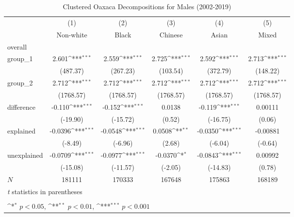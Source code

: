 \begin{table}[htbp]\centering
\def\sym#1{\ifmmode^{#1}\else\(^{#1}\)\fi}
\caption{Clustered Oaxaca Decompositions for Males (2002-2019)\label{tab1}}
\begin{tabular}{l*{5}{c}}
\hline\hline
            &\multicolumn{1}{c}{(1)}&\multicolumn{1}{c}{(2)}&\multicolumn{1}{c}{(3)}&\multicolumn{1}{c}{(4)}&\multicolumn{1}{c}{(5)}\\
            &\multicolumn{1}{c}{Non-white}&\multicolumn{1}{c}{Black}&\multicolumn{1}{c}{Chinese}&\multicolumn{1}{c}{Asian}&\multicolumn{1}{c}{Mixed}\\
\hline
overall     &                     &                     &                     &                     &                     \\
group\_1     &       2.601\sym{***}&       2.559\sym{***}&       2.725\sym{***}&       2.592\sym{***}&       2.713\sym{***}\\
            &    (487.37)         &    (267.23)         &    (103.54)         &    (372.79)         &    (148.22)         \\
group\_2     &       2.712\sym{***}&       2.712\sym{***}&       2.712\sym{***}&       2.712\sym{***}&       2.712\sym{***}\\
            &   (1768.57)         &   (1768.57)         &   (1768.57)         &   (1768.57)         &   (1768.57)         \\
difference  &      -0.110\sym{***}&      -0.152\sym{***}&      0.0138         &      -0.119\sym{***}&     0.00111         \\
            &    (-19.90)         &    (-15.72)         &      (0.52)         &    (-16.75)         &      (0.06)         \\
explained   &     -0.0396\sym{***}&     -0.0548\sym{***}&      0.0508\sym{**} &     -0.0350\sym{***}&    -0.00881         \\
            &     (-8.49)         &     (-6.96)         &      (2.68)         &     (-6.04)         &     (-0.64)         \\
unexplained &     -0.0709\sym{***}&     -0.0977\sym{***}&     -0.0370\sym{*}  &     -0.0843\sym{***}&     0.00992         \\
            &    (-15.08)         &    (-11.57)         &     (-2.05)         &    (-14.83)         &      (0.78)         \\
\hline
\(N\)       &      181111         &      170333         &      167648         &      175863         &      168189         \\
\hline\hline
\multicolumn{6}{l}{\footnotesize \textit{t} statistics in parentheses}\\
\multicolumn{6}{l}{\footnotesize \label{tab:oaxaca\_male\_clustered}}\\
\multicolumn{6}{l}{\footnotesize \sym{*} \(p<0.05\), \sym{**} \(p<0.01\), \sym{***} \(p<0.001\)}\\
\end{tabular}
\end{table}
